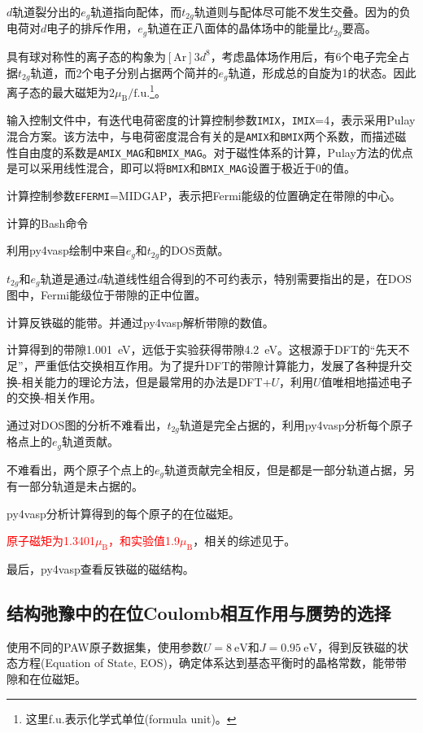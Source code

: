 $d$轨道裂分出的$e_g$轨道指向配体，而$t_{2g}$轨道则与配体尽可能不发生交叠。因为的负电荷对$d$电子的排斥作用，$e_g$轨道在正八面体的晶体场中的能量比$t_{2g}$要高。

具有球对称性的离子态的构象为$[\mathrm{Ar}]3d^8$，考虑晶体场作用后，有6个电子完全占据$t_{2g}$轨道，而2个电子分别占据两个简并的$e_g$轨道，形成总的自旋为1的状态。因此离子态的最大磁矩为$2\mu_{\mathrm{B}}/\mathrm{f.u.}$\footnote{这里\textrm{f.u.}表示化学式单位\textrm{(formula unit)}。}。

输入控制文件中，有迭代电荷密度的计算控制参数\texttt{IMIX}，\texttt{IMIX}=4，表示采用\textrm{Pulay}混合方案。该方法中，与电荷密度混合有关的是\texttt{AMIX}和\texttt{BMIX}两个系数，而描述磁性自由度的系数是\texttt{AMIX\_MAG}和\texttt{BMIX\_MAG}。对于磁性体系的计算，\textrm{Pulay}方法的优点是可以采用线性混合，即可以将\texttt{BMIX}和\texttt{BMIX\_MAG}设置于极近于0的值。

计算控制参数\texttt{EFERMI}=\textrm{MIDGAP}，表示把\textrm{Fermi}能级的位置确定在带隙的中心。

计算的\textrm{Bash}命令

利用\textrm{py4vasp}绘制中来自$e_g$和$t_{2g}$的\textrm{DOS}贡献。

$t_{2g}$和$e_g$轨道是通过$d$轨道线性组合得到的不可约表示，特别需要指出的是，在\textrm{DOS}图中，\textrm{Fermi}能级位于带隙的正中位置。

计算反铁磁的能带。并通过\textrm{py4vasp}解析带隙的数值。

计算得到的带隙\textrm{1.001~eV}，远低于实验获得带隙\textrm{4.2~eV}。这根源于\textrm{DFT}的``先天不足''，严重低估交换相互作用。为了提升\textrm{DFT}的带隙计算能力，发展了各种提升交换-相关能力的理论方法，但是最常用的办法是\textrm{DFT}+$U$，利用$U$值唯相地描述电子的交换-相关作用。

通过对\textrm{DOS}图的分析不难看出，$t_{2g}$轨道是完全占据的，利用\textrm{py4vasp}分析每个原子格点上的$e_g$轨道贡献。

不难看出，两个原子个点上的$e_g$轨道贡献完全相反，但是都是一部分轨道占据，另有一部分轨道是未占据的。

\textrm{py4vasp}分析计算得到的每个原子的在位磁矩。

\textcolor{red}{原子磁矩为1.3401$\mu_{\mathrm B}$，和实验值1.9$\mu_{\mathrm B}$}，相关的综述见于\cite{PRB62-73_2000}。

最后，\textrm{py4vasp}查看反铁磁的磁结构。

\subsection{结构弛豫中的在位\rm{Coulomb}相互作用与赝势的选择}
使用不同的\textrm{PAW}原子数据集，使用参数$U=8~\mathrm{eV}$和$J=0.95~\mathrm{eV}$，得到反铁磁的状态方程\textrm{(Equation of State, EOS)}，确定体系达到基态平衡时的晶格常数，能带带隙和在位磁矩。

